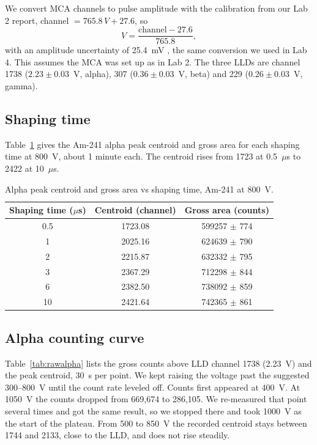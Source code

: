 \documentclass[12pt]{article}
\begin{document}
We convert MCA channels to pulse amplitude with the calibration from our Lab 2 report, channel $= 765.8\,V + 27.6$, so
\begin{equation}
V = \frac{\text{channel} - 27.6}{765.8},
\label{eq:mcacal}
\end{equation}
with an amplitude uncertainty of 25.4~mV \cite{lab2}, the same conversion we used in Lab 4. This assumes the MCA was set up as in Lab 2. The three LLDs are channel 1738 ($2.23 \pm 0.03$~V, alpha), 307 ($0.36 \pm 0.03$~V, beta) and 229 ($0.26 \pm 0.03$~V, gamma).
 
\subsection{Shaping time}
 
Table~\ref{tab:rawshape} gives the Am-241 alpha peak centroid and gross area for each shaping time at 800~V, about 1 minute each. The centroid rises from 1723 at 0.5~$\mu$s to 2422 at 10~$\mu$s.
 
\begin{table}[!htbp]
\centering\small
\begin{tabular}{ccc}
\toprule
\textbf{Shaping time ($\mu$s)} & \textbf{Centroid (channel)} & \textbf{Gross area (counts)} \\
\midrule
0.5 & 1723.08 & 599257 $\pm$ 774 \\
1 & 2025.16 & 624639 $\pm$ 790 \\
2 & 2215.87 & 632332 $\pm$ 795 \\
3 & 2367.29 & 712298 $\pm$ 844 \\
6 & 2382.50 & 738092 $\pm$ 859 \\
10 & 2421.64 & 742365 $\pm$ 861 \\
\bottomrule
\end{tabular}
\caption{Alpha peak centroid and gross area vs shaping time, Am-241 at 800~V.}
\label{tab:rawshape}
\end{table}
 
\subsection{Alpha counting curve}
 
Table~\ref{tab:rawalpha} lists the gross counts above LLD channel 1738 (2.23~V) and the peak centroid, 30~s per point. We kept raising the voltage past the suggested 300--800~V \cite{labmanual} until the count rate leveled off. Counts first appeared at 400~V. At 1050~V the counts dropped from 669,674 to 286,105. We re-measured that point several times and got the same result, so we stopped there and took 1000~V as the start of the plateau. From 500 to 850~V the recorded centroid stays between 1744 and 2133, close to the LLD, and does not rise steadily.
 
\end{document}
